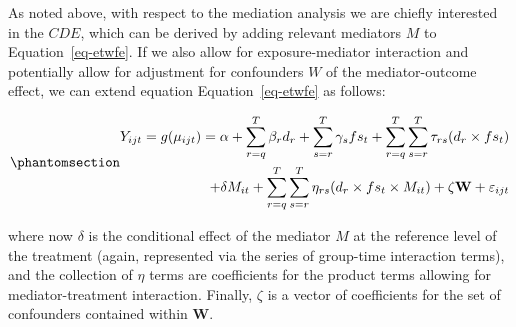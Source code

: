 \documentclass[
  letterpaper,
  DIV=11,
  numbers=noendperiod]{scrartcl}
\makeatletter
\providecommand{\DIFadd}[1]{{\protect\color{blue}\uwave{#1}}} %
\providecommand{\DIFdel}[1]{{\protect\color{red}\sout{#1}}} %
\providecommand{\DIFaddbegin}{} %
\providecommand{\DIFaddend}{} %
\providecommand{\DIFdelbegin}{} %
\providecommand{\DIFdelend}{} %
\newcommand{\DIFscaledelfig}{0.5}
\newlength{\DIFdelgraphicswidth} %
\newlength{\DIFdelgraphicsheight} %
\newcommand{\DIFaddincludegraphics}[2][]{{\color{blue}\fbox{\DIFOincludegraphics[#1]{#2}}}} %
\newcommand{\DIFdelincludegraphics}[2][]{%
\sbox{\DIFdelgraphicsbox}{\DIFOincludegraphics[#1]{#2}}%
\settoboxwidth{\DIFdelgraphicswidth}{\DIFdelgraphicsbox} %
\settoboxtotalheight{\DIFdelgraphicsheight}{\DIFdelgraphicsbox} %
\scalebox{\DIFscaledelfig}{%
\parbox[b]{\DIFdelgraphicswidth}{\usebox{\DIFdelgraphicsbox}\\[-\baselineskip] \rule{\DIFdelgraphicswidth}{0em}}\llap{\resizebox{\DIFdelgraphicswidth}{\DIFdelgraphicsheight}{%
\setlength{\unitlength}{\DIFdelgraphicswidth}%
\begin{picture}(1,1)%
\thicklines\linethickness{2pt} %
{\color[rgb]{1,0,0}\put(0,0){\framebox(1,1){}}}%
{\color[rgb]{1,0,0}\put(0,0){\line( 1,1){1}}}%
{\color[rgb]{1,0,0}\put(0,1){\line(1,-1){1}}}%
\end{picture}%
}\hspace*{3pt}}} %
} %
\DeclareRobustCommand{\DIFaddbegin}{\DIFOaddbegin \let\includegraphics\DIFaddincludegraphics} %
\DeclareRobustCommand{\DIFaddend}{\DIFOaddend \let\includegraphics\DIFOincludegraphics} %
\DeclareRobustCommand{\DIFdelbegin}{\DIFOdelbegin \let\includegraphics\DIFdelincludegraphics} %
\DeclareRobustCommand{\DIFdelend}{\DIFOaddend \let\includegraphics\DIFOincludegraphics} %
\let\sout@orig\sout %
\renewcommand{\sout}[1]{\ifmmode\text{\sout@orig{\ensuremath{#1}}}\else\sout@orig{#1}\fi} %
\makeatother
\begin{document}
As noted above, with respect to the mediation analysis we are chiefly
interested in the \(CDE\), which can be derived by adding relevant
mediators \(M\) to Equation~\ref{eq-etwfe}. If we also allow for
exposure-mediator interaction and potentially allow for adjustment for
confounders \(W\) of the mediator-outcome effect, we can extend equation
Equation~\ref{eq-etwfe} as follows:

\begin{equation}\phantomsection\DIFdelbegin %
\DIFdelend \DIFaddbegin \label{eq-etwfem}{
\begin{aligned}
Y_{ijt}=g(\mu_{ijt}) = \alpha + \sum_{r=q}^{T} \beta_{r} d_{r} + \sum_{s=r}^{T} \gamma_{s} fs_{t}+ \sum_{r=q}^{T} \sum_{s=r}^{T} \tau_{rs} (d_{r} \times fs_{t}) \\ + \delta M_{it} + \sum_{r=q}^{T} \sum_{s=r}^{T} \eta_{rs} (d_{r} \times fs_{t} \times M_{it}) + \zeta \mathbf{W} + \varepsilon_{ijt}
\end{aligned}
}\DIFaddend \end{equation}

where now \(\delta\) is the conditional effect of the mediator \(M\) at
the reference level of the treatment (again, represented via the series
of group-time interaction terms), and the collection of \DIFdelbegin \DIFdel{\(\eta\) }\DIFdelend \DIFaddbegin \DIFadd{\(\eta_{rs}\)
}\DIFaddend terms are coefficients for the product terms allowing for
mediator-treatment interaction. Finally, \(\zeta\) is a vector of
coefficients for the set of confounders contained within \(\mathbf{W}\).
\DIFdelbegin %
\end{document}

